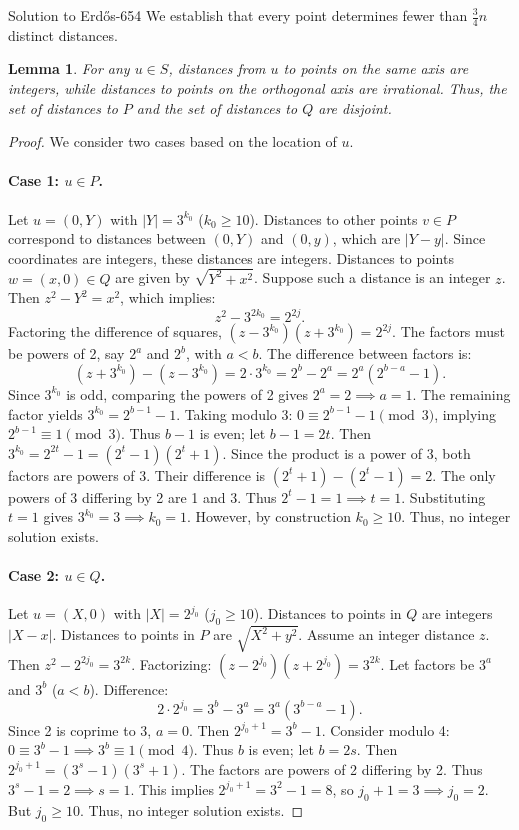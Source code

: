\documentclass{article}
\theoremstyle{plain}
\newtheorem{lemma}{Lemma}
\theoremstyle{definition}
\begin{document}
\begin{solution}{Solution to {Erdős-654}}
We establish that every point determines fewer than $\frac{3}{4}n$ distinct distances.

\begin{lemma}
For any $u \in S$, distances from $u$ to points on the same axis are integers, while distances to points on the orthogonal axis are irrational. Thus, the set of distances to $P$ and the set of distances to $Q$ are disjoint.
\end{lemma}

\begin{proof}
We consider two cases based on the location of $u$.

\paragraph{Case 1: $u \in P$.}
Let $u = (0, Y)$ with $|Y| = 3^{k_0}$ ($k_0 \ge 10$).
Distances to other points $v \in P$ correspond to distances between $(0, Y)$ and $(0, y)$, which are $|Y-y|$. Since coordinates are integers, these distances are integers.
Distances to points $w = (x, 0) \in Q$ are given by $\sqrt{Y^2 + x^2}$.
Suppose such a distance is an integer $z$. Then $z^2 - Y^2 = x^2$, which implies:
\[
z^2 - 3^{2k_0} = 2^{2j}.
\]
Factoring the difference of squares, $(z-3^{k_0})(z+3^{k_0}) = 2^{2j}$. The factors must be powers of 2, say $2^a$ and $2^b$, with $a < b$. The difference between factors is:
\[(z+3^{k_0}) - (z-3^{k_0}) = 2 \cdot 3^{k_0} = 2^b - 2^a = 2^a(2^{b-a} - 1).\]
Since $3^{k_0}$ is odd, comparing the powers of 2 gives $2^a = 2 \implies a=1$.
The remaining factor yields $3^{k_0} = 2^{b-1} - 1$.
Taking modulo 3: $0 \equiv 2^{b-1} - 1 \pmod 3$, implying $2^{b-1} \equiv 1 \pmod 3$. Thus $b-1$ is even; let $b-1 = 2t$.
Then $3^{k_0} = 2^{2t} - 1 = (2^t - 1)(2^t + 1)$.
Since the product is a power of 3, both factors are powers of 3. Their difference is $(2^t+1) - (2^t-1) = 2$.
The only powers of 3 differing by 2 are 1 and 3. Thus $2^t-1 = 1 \implies t=1$.
Substituting $t=1$ gives $3^{k_0} = 3 \implies k_0 = 1$.
However, by construction $k_0 \ge 10$. Thus, no integer solution exists.

\paragraph{Case 2: $u \in Q$.}
Let $u = (X, 0)$ with $|X| = 2^{j_0}$ ($j_0 \ge 10$).
Distances to points in $Q$ are integers $|X-x|$.
Distances to points in $P$ are $\sqrt{X^2 + y^2}$.
Assume an integer distance $z$. Then $z^2 - 2^{2j_0} = 3^{2k}$.
Factorizing: $(z-2^{j_0})(z+2^{j_0}) = 3^{2k}$.
Let factors be $3^a$ and $3^b$ ($a < b$). Difference:
\[
2 \cdot 2^{j_0} = 3^b - 3^a = 3^a(3^{b-a}-1).
\]
Since 2 is coprime to 3, $a=0$.
Then $2^{j_0+1} = 3^b - 1$.
Consider modulo 4: $0 \equiv 3^b - 1 \implies 3^b \equiv 1 \pmod 4$. Thus $b$ is even; let $b=2s$.
Then $2^{j_0+1} = (3^s-1)(3^s+1)$.
The factors are powers of 2 differing by 2.
Thus $3^s-1 = 2 \implies s=1$.
This implies $2^{j_0+1} = 3^2-1 = 8$, so $j_0+1=3 \implies j_0=2$.
But $j_0 \ge 10$. Thus, no integer solution exists.


\end{proof}
\end{solution}
\end{document}
